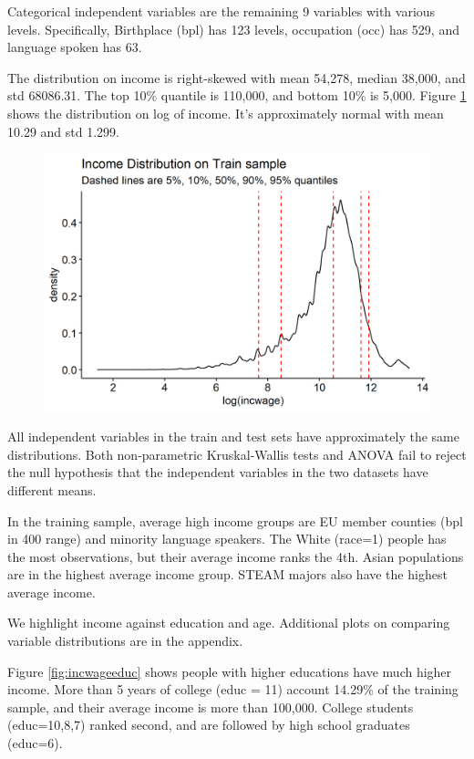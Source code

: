 \documentclass[11pt, letter,twocolumn]{article}
\begin{document}
Categorical independent variables are the remaining 9 variables with various levels. Specifically, Birthplace (bpl) has 123 levels, occupation (occ) has 529, and language spoken has 63. 

The distribution on income is right-skewed with mean 54,278, median 38,000, and std 68086.31. The top 10\% quantile is 110,000, and bottom 10\% is 5,000. Figure \ref{fig:distributionlogincome} shows the distribution on log of income. It's approximately normal with mean  10.29 and std 1.299.    

\begin{figure}[ht]
	\centering
		\caption{}
	\includegraphics[width=0.9\linewidth]{imgs/distribution_log_income}
		\label{fig:distributionlogincome}
\end{figure}

All independent variables in the train and test sets have approximately the same distributions. Both non-parametric Kruskal-Wallis tests and ANOVA  fail to reject the null hypothesis that the independent variables in the two datasets have different means.

In the training sample, average high income groups are EU member counties (bpl in 400 range) and minority language speakers. The White (race=1)  people has the most observations, but their average income ranks the 4th. Asian populations are in the highest average income group. STEAM majors also have the highest average income.  

We highlight income against education and age. Additional plots on comparing variable distributions are in the appendix.

Figure \ref{fig:incwageeduc} shows people with higher educations have much higher income. More than 5 years of college (educ = 11) account 14.29\% of the training sample, and their average income is more than 100,000. College students (educ=10,8,7) ranked second, and are followed by high school graduates (educ=6).
 
\end{document}
